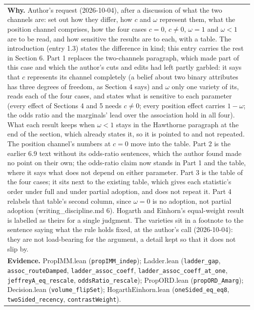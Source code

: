 \documentclass[10pt]{article}
\theoremstyle{definition}
\newlength{\fullw}\setlength{\fullw}{25.9cm}
\begin{document}
{\begin{longtable}{|p{0.9cm}|p{12.2cm}|p{12.2cm}|}
\multicolumn{3}{|p{\fullw}|}{\textbf{Why.} Author's request (2026-10-04), after a discussion of what the two channels are: set out how they differ, how $c$ and $\omega$ represent them, what the position channel comprises, how the four cases $c=0$, $c\neq0$, $\omega=1$ and $\omega<1$ are to be read, and how sensitive the results are to each, with a table. The introduction (entry 1.3) states the difference in kind; this entry carries the rest in Section 6. Part 1 replaces the two-channels paragraph, which made part of this case and which the author's cuts and edits had left partly garbled: it says that $c$ represents its channel completely (a belief about two binary attributes has three degrees of freedom, as Section 4 says) and $\omega$ only one variety of its, reads each of the four cases, and states what is sensitive to each parameter (every effect of Sections 4 and 5 needs $c\neq0$; every position effect carries $1-\omega$; the odds ratio and the marginals' lead over the association hold in all four). What each result keeps when $\omega<1$ stays in the Hawthorne paragraph at the end of the section, which already states it, so it is pointed to and not repeated. The position channel's numbers at $c=0$ move into the table. Part 2 is the earlier 6.9 text without its odds-ratio sentences, which the author found made no point on their own; the odds-ratio claim now stands in Part 1 and the table, where it says what does not depend on either parameter. Part 3 is the table of the four cases; it sits next to the existing table, which gives each statistic's order under full and under partial adoption, and does not repeat it. Part 4 relabels that table's second column, since $\omega=0$ is no adoption, not partial adoption (writing\_discipline.md 6). Hogarth and Einhorn's equal-weight result is labelled as theirs for a single judgment. The varieties sit in a footnote to the sentence saying what the rule holds fixed, at the author's call (2026-10-04): they are not load-bearing for the argument, a detail kept so that it does not slip by.} \\
\multicolumn{3}{|p{\fullw}|}{\textbf{Evidence.} PropIMM.lean (\texttt{propIMM\_indep}); Ladder.lean (\texttt{ladder\_gap}, \texttt{assoc\_routeDamped}, \texttt{ladder\_assoc\_coeff}, \texttt{ladder\_assoc\_coeff\_at\_one}, \texttt{jeffreyA\_eq\_rescale}, \texttt{oddsRatio\_rescale}); PropORD.lean (\texttt{propORD\_Amarg}); Decision.lean (\texttt{volume\_flipSet}); HogarthEinhorn.lean (\texttt{oneSided\_eq\_eq8}, \texttt{twoSided\_recency}, \texttt{contrastWeight}).} \\ \hline

\end{longtable}}
\end{document}
